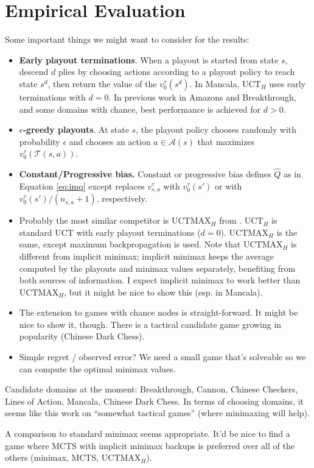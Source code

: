 \documentclass[letterpaper]{article}
\newcommand{\cA}{\mathcal{A}}
\newcommand{\cT}{\mathcal{T}}
\newcommand{\hQ}{\hat{Q}}
\begin{document}
\section{Empirical Evaluation}

\newcommand{\UCTMAXH}{$\mbox{UCTMAX}_H$\xspace}
\newcommand{\UCTH}{$\mbox{UCT}_H$\xspace}

Some important things we might want to consider for the results:

\begin{itemize}
\item {\bf Early playout terminations}. When a playout is started from state $s$, descend $d$ plies by 
      choosing actions according to a playout policy to reach state $s^d$, then return the value 
      of the $v^{\tau}_0(s^d)$. In Mancala, \UCTH uses early terminations with $d = 0$. 
      In previous work in Amazons and Breakthrough, and some domains with chance, 
      best performance is achieved for $d > 0$. 
\item {\bf $\epsilon$-greedy playouts}. 
      At state $s$, the playout policy chooses randomly with 
      probability $\epsilon$ and chooses an action $a \in \cA(s)$ that maximizes $v_0^\tau(\cT(s,a))$. 
\item {\bf Constant/Progressive bias.} Constant or progressive bias defines $\hQ$ as in Equation \ref{eq:imq} 
      except replaces $v^{\tau}_{s,a}$ with $v^{\tau}_0(s')$ or with $v^{\tau}_0(s') / (n_{s,a} + 1)$, respectively. 
\item Probably the most similar competitor is \UCTMAXH from \cite{Ramanujan11Tradeoffs}. \UCTH
      is standard UCT with early playout terminations ($d = 0$). \UCTMAXH is the same, except maximum backpropagation
      is used. Note that \UCTMAXH is different from implicit minimax; implicit minimax keeps the average computed by 
      the playouts and minimax values separately, benefiting from both sources of information. I expect implicit minimax
      to work better than \UCTMAXH, but it might be nice to show this (esp. in Mancala). 
\item The extension to games with chance nodes is straight-forward. It might be nice to show it, though. There is a tactical 
      candidate game growing in popularity (Chinese Dark Chess). 
\item Simple regret / observed error? We need a small game that's solveable so we can compute the optimal minimax values.
\end{itemize}

Candidate domains at the moment: Breakthrough, Cannon, Chinese Checkers, Lines of Action, Mancala, Chinese Dark Chess.
In terms of choosing domains, it seems like this work on ``somewhat tactical games'' (where minimaxing will help). 

A comparison to standard minimax seems appropriate. It'd be nice to find a game where MCTS with implicit minimax backups
is preferred over all of the others (minimax, MCTS, \UCTMAXH). 




\end{document}
